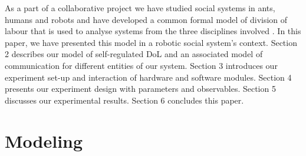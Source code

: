 \documentclass{llncs}
\begin{document}
As a part of a collaborative project we have studied social systems in ants, humans and robots and have developed a common formal model of division of labour that is used to analyse systems from the three disciplines involved \cite{Elsa}. In this paper, we have presented this model in a robotic social system's context. Section 2 describes our model of self-regulated DoL and an associated model of communication for different entities of our system. Section 3 introduces our experiment set-up and interaction of hardware and software modules. Section 4 presents our experiment design with parameters and observables. Section 5 discusses our experimental results. Section 6 concludes this paper.
%
\section{Modeling}
\label{sec:model}
\end{document}
